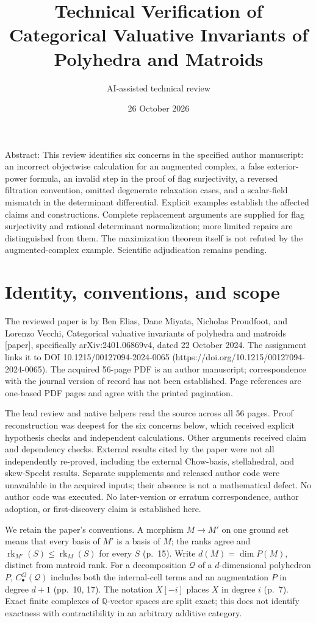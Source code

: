 \documentclass[10pt]{article}
\title{Technical Verification of
Categorical Valuative Invariants of Polyhedra and Matroids}
\author{AI-assisted technical review}
\date{26 October 2026}
\begin{document}
\maketitle
Abstract: This review identifies six concerns in the specified author manuscript: an incorrect objectwise calculation for an augmented complex, a false exterior-power formula, an invalid step in the proof of flag surjectivity, a reversed filtration convention, omitted degenerate relaxation cases, and a scalar-field mismatch in the determinant differential. Explicit examples establish the affected claims and constructions. Complete replacement arguments are supplied for flag surjectivity and rational determinant normalization; more limited repairs are distinguished from them. The maximization theorem itself is not refuted by the augmented-complex example. Scientific adjudication remains pending.\par
\section*{Identity, conventions, and scope}
The reviewed paper is by Ben Elias, Dane Miyata, Nicholas Proudfoot, and Lorenzo Vecchi, Categorical valuative invariants of polyhedra and matroids [paper], specifically arXiv:2401.06869v4, dated 22 October 2024. The assignment links it to DOI 10.1215/00127094-2024-0065 (https://doi.org/10.1215/00127094-2024-0065). The acquired 56-page PDF is an author manuscript; correspondence with the journal version of record has not been established. Page references are one-based PDF pages and agree with the printed pagination.\par
The lead review and native helpers read the source across all 56 pages. Proof reconstruction was deepest for the six concerns below, which received explicit hypothesis checks and independent calculations. Other arguments received claim and dependency checks. External results cited by the paper were not all independently re-proved, including the external Chow-basis, stellahedral, and skew-Specht results. Separate supplements and released author code were unavailable in the acquired inputs; their absence is not a mathematical defect. No author code was executed. No later-version or erratum correspondence, author adoption, or first-discovery claim is established here.\par
We retain the paper’s conventions. A morphism \(M\to M'\) on one ground set means that every basis of \(M'\) is a basis of \(M\); the ranks agree and \(\operatorname{rk}_{M'}(S)\leq\operatorname{rk}_M(S)\) for every \(S\) (p. 15). Write \(d(M)=\dim P(M)\), distinct from matroid rank. For a decomposition \(\mathcal Q\) of a \(d\)-dimensional polyhedron \(P\), \(C_\bullet^\Omega(\mathcal Q)\) includes both the internal-cell terms and an augmentation \(P\) in degree \(d+1\) (pp. 10, 17). The notation \(X[-i]\) places \(X\) in degree \(i\) (p. 7). Exact finite complexes of \(\mathbb Q\)-vector spaces are split exact; this does not identify exactness with contractibility in an arbitrary additive category.\par
\end{document}

